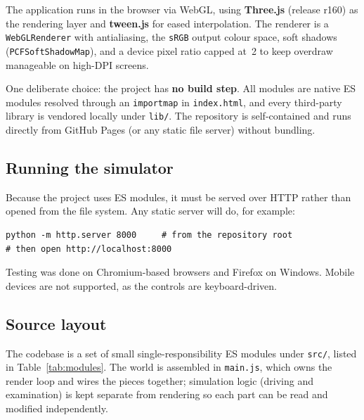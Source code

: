 \documentclass[11pt]{article}
\newcommand{\code}[1]{\texttt{#1}}
\begin{document}
The application runs in the browser via WebGL, using \textbf{Three.js}
(release r160) as the rendering layer and \textbf{tween.js} for eased
interpolation. The renderer is a \code{WebGLRenderer} with antialiasing, the
\code{sRGB} output colour space, soft shadows (\code{PCFSoftShadowMap}), and a
device pixel ratio capped at~2 to keep overdraw manageable on high-DPI screens.

One deliberate choice: the project has \textbf{no build step}. All modules are
native ES modules resolved through an \code{importmap} in \code{index.html}, and
every third-party library is vendored locally under \code{lib/}. The repository
is self-contained and runs directly from GitHub Pages (or any static file server)
without bundling.

\subsection{Running the simulator}

Because the project uses ES modules, it must be served over HTTP rather than
opened from the file system. Any static server will do, for example:

\begin{lstlisting}[language={},caption={Running the simulator locally.}]
python -m http.server 8000     # from the repository root
# then open http://localhost:8000
\end{lstlisting}

Testing was done on Chromium-based browsers and Firefox on Windows. Mobile
devices are not supported, as the controls are keyboard-driven.

\subsection{Source layout}

The codebase is a set of small single-responsibility ES modules under
\code{src/}, listed in Table~\ref{tab:modules}. The world is assembled in
\code{main.js}, which owns the render loop and wires the pieces together;
simulation logic (driving and examination) is kept separate from rendering so
each part can be read and modified independently.
\end{document}
